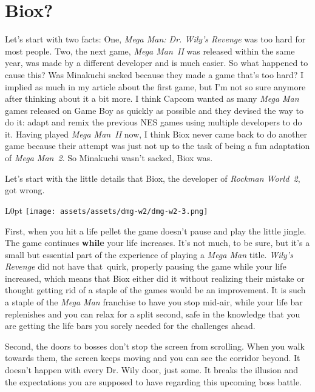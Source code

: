 \documentclass{book}
\begin{document}
\FloatBarrier\needspace{10mm}\section*{Biox?}\nopagebreak[4]

Let’s start with two facts: One, \emph{Mega Man: Dr. Wily’s Revenge} was too hard for most people. Two, the next game, \emph{Mega Man II} was released within the same year, was made by a different developer and is much easier. So what happened to cause this? Was Minakuchi sacked because they made a game that’s too hard? I implied as much in my article about the first game, but I’m not so sure anymore after thinking about it a bit more. I think Capcom wanted as many \emph{Mega Man} games released on Game Boy as quickly as possible and they devised the way to do it: adapt and remix the previous NES games using multiple developers to do it. Having played \emph{Mega Man II} now, I think Biox never came back to do another game because their attempt was just not up to the task of being a fun adaptation of \emph{Mega Man 2}. So Minakuchi wasn’t sacked, Biox was.

Let’s start with the little details that Biox, the developer of \emph{Rockman World 2}, got wrong.

\begin{wrapfigure}{L}{0pt} \texttt{[image: assets/assets/dmg-w2/dmg-w2-3.png]}\end{wrapfigure}
First, when you hit a life pellet the game doesn’t pause and play the little jingle. The game continues \textbf{while} your life increases. It’s not much, to be sure, but it’s a small but essential part of the experience of playing a \emph{Mega Man} title. \emph{Wily’s Revenge} did not have that quirk, properly pausing the game while your life increased, which means that Biox either did it without realizing their mistake or thought getting rid of a staple of the games would be an improvement. It is such a staple of the \emph{Mega Man} franchise to have you stop mid-air, while your life bar replenishes and you can relax for a split second, safe in the knowledge that you are getting the life bars you sorely needed for the challenges ahead.

Second, the doors to bosses don’t stop the screen from scrolling. When you walk towards them, the screen keeps moving and you can see the corridor beyond. It doesn’t happen with every Dr. Wily door, just some. It breaks the illusion and the expectations you are supposed to have regarding this upcoming boss battle.
\end{document}
